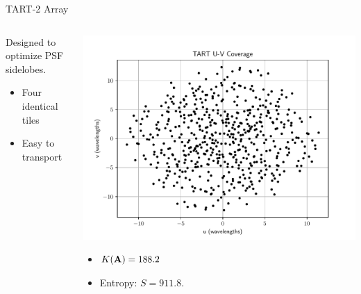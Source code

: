 \documentclass[ignorenonframetext]{beamer}
\begin{document}
\begin{frame}{TART-2 Array}
 \begin{columns}[T]
  \begin{column}{0.5\linewidth}
  Designed to optimize PSF sidelobes.
  \begin{itemize}
   \item Four identical tiles
   \item Easy to transport
  \end{itemize}
  \end{column}
  \begin{column}{0.5\linewidth}
  \includegraphics[width=\linewidth]{fig/TART_UV.pdf}
  \begin{itemize}
   \item $K(\mathbf{A}) = 188.2$
   \item Entropy: $S = 911.8$.
  \end{itemize}
  \end{column}
 \end{columns}
\end{frame}
\end{document}
